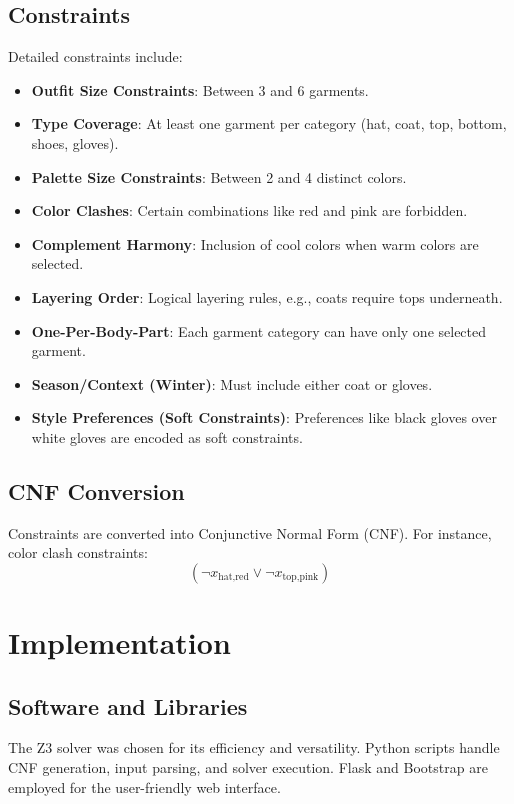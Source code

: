 \documentclass[unicode,11pt,a4paper,oneside,numbers=endperiod,openany]{scrartcl}
\begin{document}
\subsection{Constraints}
Detailed constraints include:
\begin{itemize}
    \item \textbf{Outfit Size Constraints}: Between 3 and 6 garments.
    \item \textbf{Type Coverage}: At least one garment per category (hat, coat, top, bottom, shoes, gloves).
    \item \textbf{Palette Size Constraints}: Between 2 and 4 distinct colors.
    \item \textbf{Color Clashes}: Certain combinations like red and pink are forbidden.
    \item \textbf{Complement Harmony}: Inclusion of cool colors when warm colors are selected.
    \item \textbf{Layering Order}: Logical layering rules, e.g., coats require tops underneath.
    \item \textbf{One-Per-Body-Part}: Each garment category can have only one selected garment.
    \item \textbf{Season/Context (Winter)}: Must include either coat or gloves.
    \item \textbf{Style Preferences (Soft Constraints)}: Preferences like black gloves over white gloves are encoded as soft constraints.
\end{itemize}

\subsection{CNF Conversion}
Constraints are converted into Conjunctive Normal Form (CNF). For instance, color clash constraints:
\[
    (\neg x_{\text{hat},\text{red}} \lor \neg x_{\text{top},\text{pink}})
\]

\section{Implementation}
\subsection{Software and Libraries}
The Z3 solver was chosen for its efficiency and versatility. Python scripts handle CNF generation, input parsing, and solver execution. Flask and Bootstrap are employed for the user-friendly web interface.
\end{document}
